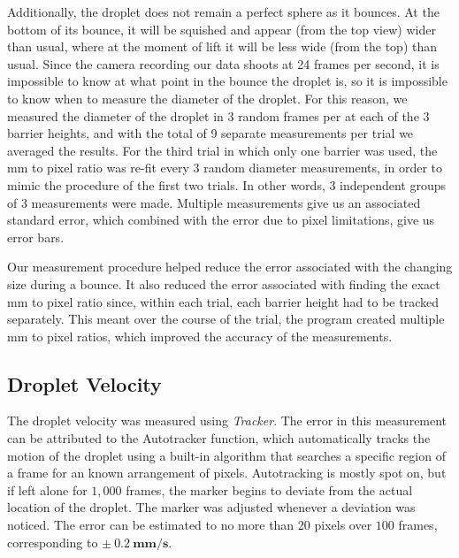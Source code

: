 Additionally, the droplet does not remain a perfect sphere as it bounces. At the bottom of its bounce, it will be squished and appear (from the top view) wider than usual, where at the moment of lift it will be less wide (from the top) than usual. Since the camera recording our data shoots at 24 frames per second, it is impossible to know at what point in the bounce the droplet is, so it is impossible to know when to measure the diameter of the droplet. For this reason, we measured the diameter of the droplet in 3 random frames per at each of the 3 barrier heights, and with the total of 9 separate measurements per trial we averaged the results. For the third trial in which only one barrier was used, the mm to pixel ratio was re-fit every 3 random diameter measurements, in order to mimic the procedure of the first two trials. In other words, 3 independent groups of 3 measurements were made. Multiple measurements give us an associated standard error, which combined with the error due to pixel limitations, give us error bars. 

Our measurement procedure helped reduce the error associated with the changing size during a bounce. It also reduced the error associated with finding the exact mm to pixel ratio since, within each trial, each barrier height had to be tracked separately. This meant over the course of the trial, the program created multiple mm to pixel ratios, which improved the accuracy of the measurements.

    \subsection{Droplet Velocity}
The droplet velocity was measured using \textit{Tracker}. The error in this measurement can be attributed to the Autotracker function, which automatically tracks the motion of the droplet using a built-in algorithm that searches a specific region of a frame for an known arrangement of pixels. Autotracking is mostly spot on, but if left alone for $1,000$ frames, the marker begins to deviate from the actual location of the droplet. The marker was adjusted whenever a deviation was noticed. The error can be estimated to no more than 20 pixels over $100$ frames, corresponding to $\mathbf{\pm~0.2~\mathrm{\textbf{mm/s}}}$.

